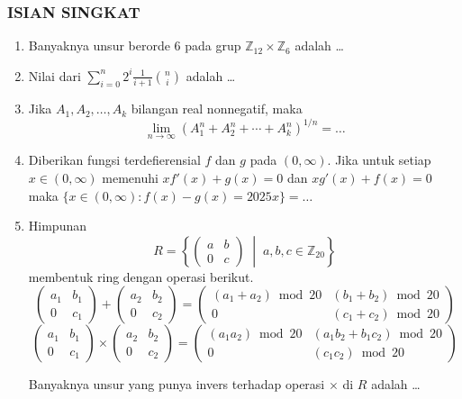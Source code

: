 \documentclass[12pt,twoside]{article}
\begin{document}
\subsubsection*{ISIAN SINGKAT}
\begin{enumerate}
	\item Banyaknya unsur berorde $6$ pada grup $\mathbb{Z}_{12} \times \mathbb{Z}_6$ adalah \dots

	\item Nilai dari
	      $
		      \sum_{i=0}^{n} 2^i \frac{1}{i+1} \binom{n}{i}
	      $
	      adalah \dots

	\item Jika $A_1, A_2, \dots, A_k$ bilangan real nonnegatif, maka
	      \[
		      \lim_{n\to\infty} (A_1^n + A_2^n + \cdots + A_k^n)^{1/n} = \dots
	      \]

	\item Diberikan fungsi terdefierensial $f$ dan $g$ pada $(0,\infty)$. Jika untuk setiap $x\in (0,\infty)$
	      memenuhi $x f'(x) + g(x) = 0$ dan $x g'(x) + f(x) = 0$ maka
	      $
		      \{x\in (0,\infty) : f(x) - g(x) = 2025 x\} = \dots
	      $

	\item Himpunan
	      \[
		      R = \left\{
		      \begin{pmatrix}
			      a & b \\
			      0 & c
		      \end{pmatrix}
		      \;\middle|\;
		      a,b,c\in \mathbb{Z}_{20}
		      \right\}
	      \]
	      membentuk ring dengan operasi berikut.
	      \[
		      \begin{pmatrix}
			      a_1 & b_1 \\ 0 & c_1
		      \end{pmatrix}
		      +
		      \begin{pmatrix}
			      a_2 & b_2 \\ 0 & c_2
		      \end{pmatrix}
		      =
		      \begin{pmatrix}
			      (a_1+a_2)\bmod 20 & (b_1+b_2)\bmod 20 \\
			      0                 & (c_1+c_2)\bmod 20
		      \end{pmatrix}
	      \]
	      \[
		      \begin{pmatrix}
			      a_1 & b_1 \\ 0 & c_1
		      \end{pmatrix}
		      \times
		      \begin{pmatrix}
			      a_2 & b_2 \\ 0 & c_2
		      \end{pmatrix}
		      =
		      \begin{pmatrix}
			      (a_1 a_2)\bmod 20 & (a_1 b_2 + b_1 c_2)\bmod 20 \\
			      0                 & (c_1 c_2)\bmod 20
		      \end{pmatrix}
	      \]

	      Banyaknya unsur yang punya invers terhadap operasi $\times$ di $R$ adalah \dots
\end{enumerate}
\end{document}
